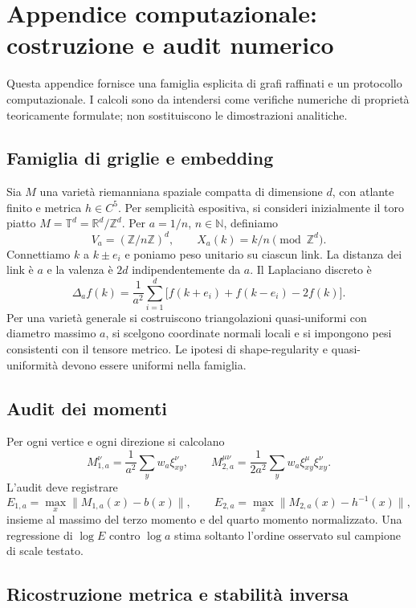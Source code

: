 \section{Appendice computazionale: costruzione e audit numerico}
\label{app:computational}

Questa appendice fornisce una famiglia esplicita di grafi raffinati e un
protocollo computazionale. I calcoli sono da intendersi come
verifiche numeriche di proprietà teoricamente formulate; non sostituiscono
le dimostrazioni analitiche.

\subsection{Famiglia di griglie e embedding}

Sia $M$ una varietà riemanniana spaziale compatta di dimensione $d$,
con atlante finito e metrica $h\in C^5$. Per semplicità espositiva,
si consideri inizialmente il toro piatto
$M=\mathbb T^d=\mathbb R^d/\mathbb Z^d$. Per
$a=1/n$, $n\in\mathbb N$, definiamo
\[
V_a=(\mathbb Z/n\mathbb Z)^d,
\qquad
X_a(k)=k/n\pmod{\mathbb Z^d}.
\]
Connettiamo $k$ a $k\pm e_i$ e poniamo peso unitario su ciascun link.
La distanza dei link è $a$ e la valenza è $2d$ indipendentemente da
$a$. Il Laplaciano discreto è
\[
\Delta_a f(k)=\frac1{a^2}\sum_{i=1}^d
\bigl[f(k+e_i)+f(k-e_i)-2f(k)\bigr].
\]
Per una varietà generale si costruiscono triangolazioni quasi-uniformi
con diametro massimo $a$, si scelgono coordinate normali locali e si
impongono pesi consistenti con il tensore metrico. Le ipotesi di
shape-regularity e quasi-uniformità devono essere uniformi nella
famiglia.

\subsection{Audit dei momenti}

Per ogni vertice e ogni direzione si calcolano
\[
M_{1,a}^\nu=\frac1{a^2}\sum_yw_a\xi_{xy}^\nu,
\qquad
M_{2,a}^{\mu\nu}=\frac1{2a^2}\sum_yw_a\xi_{xy}^\mu\xi_{xy}^\nu.
\]
L'audit deve registrare
\[
E_{1,a}=\max_x\|M_{1,a}(x)-b(x)\|,
\qquad
E_{2,a}=\max_x\|M_{2,a}(x)-h^{-1}(x)\|,
\]
insieme al massimo del terzo momento e del quarto momento normalizzato.
Una regressione di $\log E$ contro $\log a$ stima soltanto l'ordine
osservato sul campione di scale testato.

\subsection{Ricostruzione metrica e stabilità inversa}

